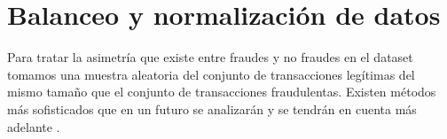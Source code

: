 \documentclass[11pt,a4paper]{article}
\begin{document}
\section{Balanceo y normalización de datos}

Para tratar la asimetr\'ia que existe entre fraudes y no fraudes en el dataset tomamos una muestra aleatoria del conjunto de transacciones leg\'itimas del mismo tama\~no que el conjunto de transacciones fraudulentas. Existen m\'etodos m\'as sofisticados que en un futuro se analizar\'an y se tendr\'an en cuenta m\'as adelante \cite{japkowicz2000learning, dal2015calibrating, zhu2020optimizing, li2021hybrid}.







\end{document}
